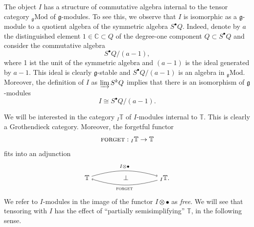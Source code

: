 \documentclass[11pt]{article}
\theoremstyle{plain}
\theoremstyle{nonumberplain}
\theoremstyle{plain}
\numberwithin{equation}{section}
\theoremstyle{nonumberplain}
\newcommand\bC{{\mathbb C}}
\newcommand\bT{{\mathbb T}}
\newcommand\fg{{\mathfrak g}}
\newcommand\md{\mathrm{Mod}}
\newcommand\1{{\bf 1}}
\newcommand{\cat}[1]{\textsc{#1}}
\begin{document}
The object $I$ has a structure of commutative algebra internal to the tensor category ${}_{\fg}\md$ of $\fg$-modules. To see this, we observe that $I$ is isomorphic as a $\fg$-module to a quotient algebra of the symmetric algebra $S^{\bullet}Q$.
 Indeed, denote by $a$ the distinguished element $1\in \bC\subset Q$ of the degree-one component 
  $Q\subset S^{\bullet}Q$
and consider the commutative algebra 
\begin{equation*}
  S^{\bullet}Q/(a-1),
\end{equation*}
where 1 ist the unit of the symmetric algebra and $(a-1)$ is the ideal generated by $a-1$. This ideal is clearly $\fg$-stable and $S^{\bullet}Q/(a-1)$ is an algebra in ${}_\fg \md$. Moreover, the definition of $I$ as $\varinjlim S^k Q$ implies that there is an isomorphism of $\fg$-modules \begin{equation*}
I\cong S^{\bullet}Q/(a-1).
\end{equation*}


	
	
We will be interested in the category ${}_I\bT$ of $I$-modules internal to $\bT$. This is clearly a Grothendieck category. Moreover, the forgetful functor
\begin{equation*}
  \cat{forget}:{}_I\bT\to \bT
\end{equation*}
fits into an adjunction
\begin{equation}\label{eq:tit}
 \begin{tikzpicture}[auto,baseline=(current  bounding  box.center)]
   \path[anchor=base] (0,0) node (1) {$\bT$} 
   +(4,0) node (2) {${}_I\bT.$}
   +(2,0) node (3) {$\bot$}
   ;
   \draw[->] (1) to[bend left=16] node[pos=.5,auto] {$\scriptstyle I\otimes\bullet$} (2);
   \draw[->] (2) to[bend left=16] node[pos=.5,auto] {$\scriptstyle \cat{forget}$} (1);
 \end{tikzpicture}
\end{equation}
We refer to $I$-modules in the image of the functor $I\otimes \bullet$ as {\it free}. We will see that tensoring with $I$ has the effect of ``partially semisimplifying'' $\bT$, in the following sense.
\end{document}
